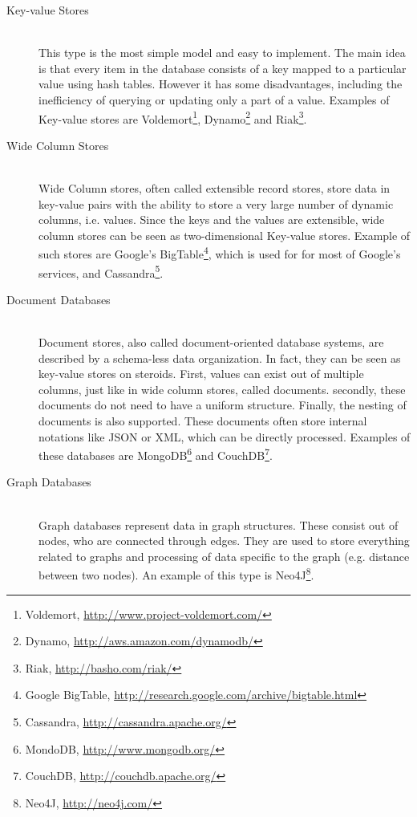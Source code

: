 \documentclass[a4paper,12pt]{report}
\begin{document}
\begin{description}
    \item[Key-value Stores] \hfill \\This type is the most simple model and easy to implement. The main idea is that every item in the database consists of a key mapped to a particular value using hash tables. However it has some disadvantages, including the inefficiency of querying or updating only a part of a value. Examples of Key-value stores are Voldemort\footnote{Voldemort, \url{http://www.project-voldemort.com/}}, Dynamo\footnote{Dynamo, \url{http://aws.amazon.com/dynamodb/}} and Riak\footnote{Riak, \url{http://basho.com/riak/}}.
    \item[Wide Column Stores] \hfill \\Wide Column stores, often called extensible record stores, store data in key-value pairs with the ability to store a very large number of dynamic columns, i.e. values. Since the keys and the values are extensible, wide column stores can be seen as two-dimensional Key-value stores. Example of such stores are Google's BigTable\footnote{Google BigTable, \url{http://research.google.com/archive/bigtable.html}}, which is used for for most of Google's services, and Cassandra\footnote{Cassandra, \url{http://cassandra.apache.org/}}.
    \item[Document Databases] \hfill \\Document stores, also called document-oriented database systems, are described by a schema-less data organization. In fact, they can be seen as key-value stores on steroids. First, values can exist out of multiple columns, just like in wide column stores, called documents. secondly, these documents do not need to have a uniform structure. Finally, the nesting of documents is also supported. These documents often store internal notations like JSON or XML, which can be directly processed. Examples of these databases are MongoDB\footnote{MondoDB, \url{http://www.mongodb.org/}} and CouchDB\footnote{CouchDB, \url{http://couchdb.apache.org/}}.    
    \item[Graph Databases] \hfill \\Graph databases represent data in graph structures. These consist out of nodes, who are connected through edges. They are used to store everything related to graphs and processing of data specific to the graph (e.g. distance between two nodes). An example of this type is Neo4J\footnote{Neo4J, \url{http://neo4j.com/}}.    
\end{description}
\end{document}
